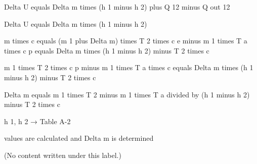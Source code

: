 Delta U equals Delta m times (h 1 minus h 2) plus Q 12 minus Q out 12  

Delta U equals Delta m times (h 1 minus h 2)  

m times c equals (m 1 plus Delta m) times T 2 times c e minus m 1 times T a times c p equals Delta m times (h 1 minus h 2) minus T 2 times c  

m 1 times T 2 times c p minus m 1 times T a times c equals Delta m times (h 1 minus h 2) minus T 2 times c  

Delta m equals m 1 times T 2 minus m 1 times T a divided by (h 1 minus h 2) minus T 2 times c  

h 1, h 2 → Table A-2  

values are calculated and Delta m is determined

(No content written under this label.)